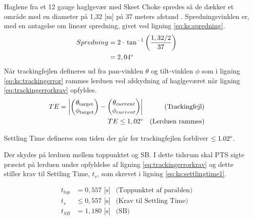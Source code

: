 Haglene fra et 12 gauge haglgevær med Skeet Choke spredes så de dækker et område
med en diameter på 1,32 [m] på 37 meters afstand
\citep[Pattern and choke]{patternandchoke}.
Spredningsvinklen er, med en antagelse om lineær spredning, givet ved ligning \ref{eq:ks:spredning}.
\begin{align}
\begin{split}
  Spredning &= 2\cdot{}\tan^{-1}\left(\frac{1,32/2}{37}\right) \\
  &= 2,04 \degree
  \end{split}
  \label{eq:ks:spredning}
\end{align}
Når trackingfejlen defineres ud fra pan-vinklen \(\theta\) og tilt-vinklen \(\phi\) som i ligning \ref{eq:ks:trackingerror} rammes 
lerduen ved afskydning af haglgeværet når ligning \ref{eq:trackingerrorkrav} opfyldes.
\begin{align}
  TE = \left | \begin{pmatrix}  \theta_{\text{target}}\\ \phi_{\text{target}}\end{pmatrix} - \begin{pmatrix} \theta_{current}\\ 
  \phi_{current}\end{pmatrix} \right | &&\text{(Trackingfejl)}
\label{eq:ks:trackingerror}
\\
	TE\leq 1,02 \degree && \text{(Lerduen rammes)}
\label{eq:trackingerrorkrav}
\end{align}

Settling Time defineres som tiden der går før trackingfejlen forbliver \(\leq 1.02 \degree\).

Der skydes på lerduen mellem toppunktet og SB.
I dette tidsrum skal PTS sigte præcist på lerduen under opfyldelse af ligning \ref{eq:trackingerrorkrav} og dette 
stiller krav til Settling Time, \(t_s\), som skrevet i ligning \ref{eq:ks:settlingtime1}.

\begin{align}
  t_{top} &= 0,557\text{ [s]} &\text{(Toppunktet af parablen)}
  \label{eq:ks:toppunktstid}
  \\
  t_{s} & \leq 0,557\text{ [s]} &\text{(Krav til Settling Time)}
  \label{eq:ks:settlingtime1}
  \\
   t_{SB} &= 1,180 \text{ [s]} &\text{(SB)}
  \label{eq:ks:toppunktstid}
\end{align}

